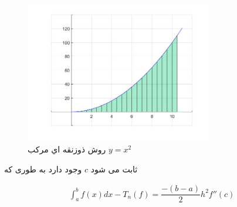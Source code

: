\documentclass{article}
\begin{document}
\begin{figure}[!h]
    \centering
\includegraphics[width=8.2cm]{pic46codeIntegral.jpg}
    \caption{ روش ذوزنقه اي مرکب $y=x^2$ }
    \label{fig:انتگرال خط}
\end{figure}

\newpage
ثابت می شود $c$
وجود دارد به طوری که 


\begin{align*}
    \int_{a}^{b} f(x)dx - T_{n}(f) =\dfrac {-(b-a)}{2} h^2 f''(c)
\end{align*}

\pagebreak


\end{document}
